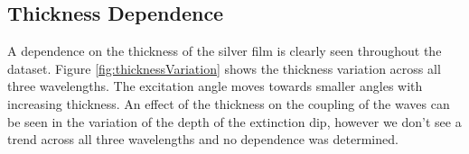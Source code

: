 \documentclass[%
reprint,
amsmath,amssymb,
aps,
]{revtex4-2}
\begin{document}
			\begin{table}[]
				\caption{A table of the dielectric constant of silver taken from M. Polyanskiy \cite{refractiveIndex}. Note that the imaginary component of $\epsilon_1$ is neglected as a first approximation.}
				\label{tab:dielectric}
			\end{table}
		
		
		\subsection{Thickness Dependence}
			
			A dependence on the thickness of the silver film is clearly seen throughout the dataset. Figure \ref{fig:thicknessVariation} shows the thickness variation across all three wavelengths. The excitation angle moves towards smaller angles with increasing thickness. An effect of the thickness on the coupling of the waves can be seen in the variation of the depth of the extinction dip, however we don't see a trend across all three wavelengths and no dependence was determined.
			
\end{document}
